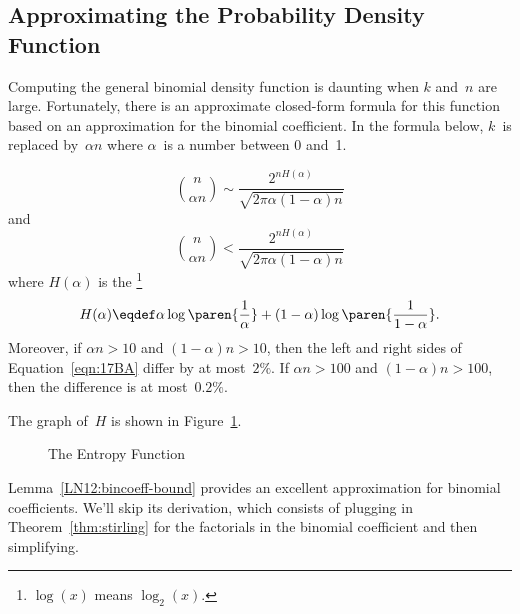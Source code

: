 \begin{editingnotes}

\subsection{Approximating the Probability Density Function}

Computing the general binomial density function is daunting when $k$
and~$n$ are large.  Fortunately, there is an approximate closed-form
formula for this function based on an approximation for the binomial
coefficient.  In the formula below, $k$~is replaced by~$\alpha n$
where $\alpha$~is a number between 0 and~1.
%
\begin{lemma}\label{LN12:bincoeff-bound}
\begin{equation}\label{eqn:17BA}
\binom{n}{\alpha n}
        \sim \frac{2^{n H(\alpha)}}{\sqrt{2 \pi \alpha (1 - \alpha) n}}
\end{equation}
and
\begin{equation}\label{eqn:17A3}
\binom{n}{\alpha n} < \frac{ 2^{n H(\alpha)} }
                           { \sqrt{2 \pi \alpha (1 - \alpha) n} }
\end{equation}
where $H(\alpha)$ is the \footnote{$\log(x)$
  means $\log_2(x)$.}
\begin{equation*}
H(\alpha) \eqdef \alpha \log\paren{\frac{1}{\alpha}} +
                (1 - \alpha) \log\paren{\frac{1}{1 - \alpha}}.
\end{equation*}
Moreover, if $\alpha n > 10$ and $(1 - \alpha) n > 10$, then the left
and right sides of Equation~\ref{eqn:17BA} differ by at most~$2\%$.  If
$\alpha n > 100$ and $(1 - \alpha) n > 100$, then the difference is at
most~$0.2\%$.
\end{lemma}

The graph of~$H$ is shown in Figure~\ref{LN12:entropy}.

\begin{figure}


\caption{The Entropy Function}
\label{LN12:entropy}

\end{figure}

Lemma~\eqref{LN12:bincoeff-bound} provides an excellent approximation
for binomial coefficients.  We'll skip its derivation, which consists
of plugging in Theorem~\ref{thm:stirling} for the factorials in the
binomial coefficient and then simplifying.


\end{editingnotes}
